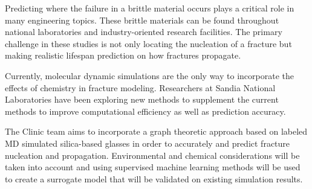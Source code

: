 
Predicting where the failure in a brittle material occurs plays a critical role in many engineering topics. These brittle materials can be found throughout national laboratories and industry-oriented research facilities. The primary challenge in these studies is not only locating the nucleation of a fracture but making realistic lifespan prediction on how fractures propagate. 

 Currently, molecular dynamic simulations are the only way to incorporate the effects of chemistry in fracture modeling. Researchers at Sandia National Laboratories have been exploring new methods to supplement the current methods to improve computational efficiency as well as prediction accuracy. 

The Clinic team aims to incorporate a graph theoretic approach based on labeled MD simulated silica-based glasses in order to accurately and predict fracture nucleation and propagation. Environmental and chemical considerations will be taken into account and using supervised machine learning methods will be used to create a surrogate model that will be validated on existing simulation results. 


 
 
 
